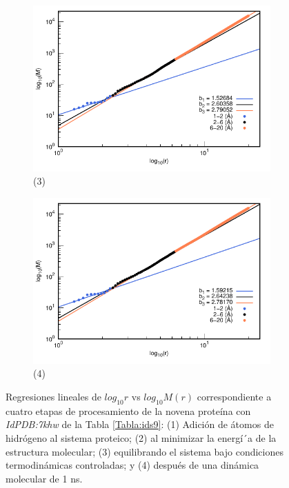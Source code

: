 \begin{figure}[H]
	\vspace{0cm} %
	
	\hspace{-0.3cm} 
	\begin{subfigure}{0.49\textwidth}
		\centering
		\includegraphics[width=\linewidth,page=1]{graphs/PDBs/7khw/7khwEq.pdf}
		\caption{(3)}
	\end{subfigure}
	\hspace{0.2cm}
	\begin{subfigure}{0.49\textwidth} %
		\centering
		\includegraphics[width=\linewidth,page=1]{graphs/PDBs/7khw/7khw1ns.pdf}
		\caption{(4)}
	\end{subfigure}
	\caption{Regresiones lineales de $log_{10}r$ vs $log_{10}M(r)$ correspondiente a cuatro etapas de procesamiento de la novena prote\'{i}na con \textit{IdPDB:7khw} de la Tabla \ref{Tabla:ids9}: (1) Adici\'{o}n de \'{a}tomos de hidr\'{o}geno al sistema proteico; (2) al minimizar la energ\'{i´}a de la estructura molecular; (3) equilibrando el sistema bajo condiciones termodin\'{a}micas controladas; y (4) despu\'{e}s de una din\'{a}mica molecular de 1 ns.}
	\label{fig:7khw}
\end{figure}


